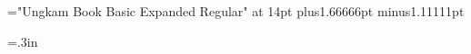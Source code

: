 \font\ExpandedRm="Ungkam Book Basic Expanded Regular" at 14pt
\settypefieldbymargins{1in}{1in}{1in}{1in}
\spaceskip 3.33333pt plus1.66666pt minus1.11111pt
 
\parindent5mm

\def\tlatnumspacing{\dimen@\spaceskip\spaceskip\dimen@\relax}

\newtoks\titletoks

\def\title#1{\global\titletoks{#1}}

\baselineskip12pt  

\newcount\figurecount {}

\intercolgutter=.3in


\noblackboxes

 

\centrehdrinfo{\ifnumberthispage\ten\rm \firstmark\fi}
\lefthdrinfo{\ifodd\pageno\else\ten\rm\folio\fi}
\righthdrinfo{\ifodd\pageno\ten\rm\folio\fi}


\def\X#1{\csname #1\endcsname}

\def\chapterspacing{\penalty-2000\vskip36pt plus7pt minus6pt}
\def\headingspacing{\penalty-1000\vskip20pt plus6pt minus4pt}

\newdimen\calcedpagetotal \newdimen\calctmp \newif\ifdidMaybeEject
\def\calcpagetotal{\calcedpagetotal\pagetotal
  \ifdim\footnoteSize>0pt
    \advance\calcedpagetotal\footnoteSize
    \advance\calcedpagetotal10pt
  \fi
  \peek 
  \ifdim\ht\popped<\vsize
     \advance\calcedpagetotal\ht\popped
     \dimen\calctmp=\vsize
     \ifdim\calcedpagetotal>\dimen\calctmp
       \wlog{\calcedpagetotal =\the\calcedpagetotal > \the\dimen\calctmp (\the\vsize+\the\pageshrink)}%
       \wlog{removing \ht\popped=\the\ht\popped from calcedpagetotal}%
       \advance\calcedpagetotal-\ht\popped\fi
  \fi
  \voidpop}

\def\doMaybeEject{%
  \global\didMaybeEjecttrue
  \wlog{doMaybeEject: forcing eject}%
  \vfil\eject
}

